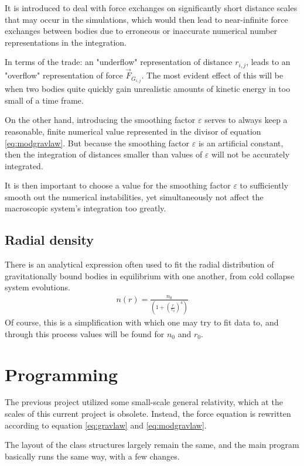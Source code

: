 \documentclass[11pt,a4paper,notitlepage,twocolumn]{article}
\begin{document}
It is introduced to deal with force exchanges on significantly short distance scales that may occur in the simulations, which would then lead to near-infinite force exchanges between bodies due to erroneous or inaccurate numerical number representations in the integration.

In terms of the trade: an "underflow" representation of distance $r_{i,j}$, leads to an "overflow" representation of force $\vec{F}_{G_{i,j}}$. The most evident effect of this will be when two bodies quite quickly gain unrealistic amounts of kinetic energy in too small of a time frame.

On the other hand, introducing the smoothing factor $\varepsilon$ serves to always keep a reasonable, finite numerical value represented in the divisor of equation \ref{eq:modgravlaw}. But because the smoothing factor $\varepsilon$ is an artificial constant, then the integration of distances smaller than values of $\varepsilon$ will not be accurately integrated.

It is then important to choose a value for the smoothing factor $\varepsilon$ to sufficiently smooth out the numerical instabilities, yet simultaneously not affect the macroscopic system's integration too greatly.

\subsection{Radial density}
There is an analytical expression often used to fit the radial distribution of gravitationally bound bodies in equilibrium with one another, from cold collapse system evolutions.
\begin{align}
n(r) = \frac{n_0}{\left( 1 + \left(\frac{r}{r_0}\right)^4\right)}\label{eq:radDens}
\end{align}
Of course, this is a simplification with which one may try to fit data to, and through this process values will be found for $n_0$ and $r_0$.

\section{Programming}
The previous project utilized some small-scale general relativity, which at the scales of this current project is obsolete. Instead, the force equation is rewritten according to equation \ref{eq:gravlaw} and \ref{eq:modgravlaw}.

The layout of the class structures largely remain the same, and the main program basically runs the same way, with a few changes.
\end{document}
